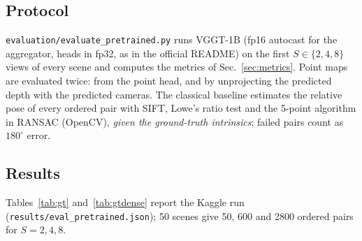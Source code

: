 \documentclass[11pt,a4paper]{article}
\begin{document}
\subsection{Protocol}

\texttt{evaluation/evaluate\_pretrained.py} runs VGGT-1B (fp16 autocast for the aggregator, heads in fp32, as in the
official README) on the first $S\in\{2,4,8\}$ views of every scene and computes the metrics of Sec.~\ref{sec:metrics}.
Point maps are evaluated twice: from the point head, and by unprojecting the predicted depth with the predicted cameras.
The classical baseline estimates the relative pose of every ordered pair with SIFT, Lowe's ratio test and the 5-point
algorithm in RANSAC (OpenCV), \emph{given the ground-truth intrinsics}; failed pairs count as $180^\circ$ error.

\subsection{Results}

Tables~\ref{tab:gt} and~\ref{tab:gtdense} report the Kaggle run (\texttt{results/eval\_pretrained.json}); 50 scenes give
50, 600 and 2800 ordered pairs for $S = 2, 4, 8$.

\begin{table}[htbp]
\centering
\caption{Camera pose of the released VGGT-1B on 50 rendered scenes with exact ground truth, against SIFT + 5-point RANSAC
given the ground-truth intrinsics. Pairwise metrics over all ordered frame pairs; best per $S$ in bold.}
\label{tab:gt}
\end{table}
\end{document}
